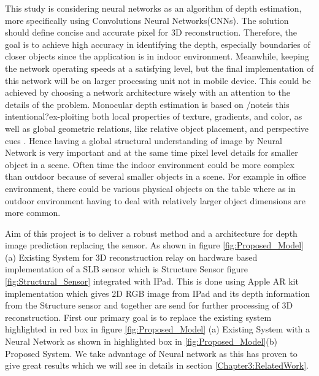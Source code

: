 This study is considering neural networks as an algorithm of depth estimation, more specifically using Convolutions Neural Networks(CNNs). The solution should define concise and accurate pixel for 3D reconstruction. Therefore, the goal is to achieve high accuracy in identifying the depth, especially boundaries of closer objects since the application is in indoor environment. Meanwhile, keeping the network operating speeds at a satisfying level, but the final implementation of this network will be on larger processing unit not in mobile device. This could be achieved by choosing a network architecture wisely with an attention to the details of the problem. Monocular depth estimation is based on /note{is this intentional?}ex-ploiting both local properties of texture, gradients, and color, as well as global geometric relations, like relative object placement, and perspective cues \cite{saxena2006learning}. Hence having a global structural understanding of image by Neural Network is very important and at the same time pixel level details for smaller object in a scene. Often time the indoor environment could be more complex than outdoor because of several smaller objects in a scene. For example in office environment, there could be various physical objects on the table where as in outdoor environment having to deal with relatively larger object dimensions are more common.  

Aim of this project is to deliver a robust method and a architecture for depth image prediction replacing the sensor. As shown in figure \ref{fig:Proposed_Model} (a) Existing System for 3D reconstruction relay on hardware based implementation of a SLB sensor which is Structure Sensor figure \ref{fig:Structural_Sensor} integrated with IPad. This is done using Apple AR kit implementation which gives 2D RGB image from IPad and its depth information from the Structure sensor and together are send for further processing of 3D reconstruction. First our primary goal is to replace the existing system highlighted in red box in figure \ref{fig:Proposed_Model} (a) Existing System with a Neural Network as shown in highlighted box in \ref{fig:Proposed_Model}(b) Proposed System. We take advantage of Neural network as this has proven to give great results which we will see in details in section \ref{Chapter3:RelatedWork}.


